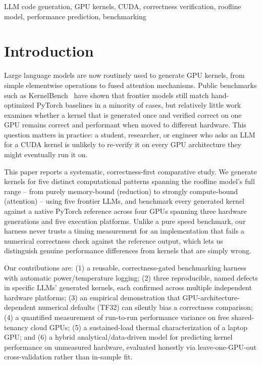 \documentclass[conference]{IEEEtran}
\begin{document}
\begin{IEEEkeywords}
LLM code generation, GPU kernels, CUDA, correctness verification, roofline model, performance
prediction, benchmarking
\end{IEEEkeywords}

\section{Introduction}

Large language models are now routinely used to generate GPU kernels, from simple elementwise
operations to fused attention mechanisms. Public benchmarks such as KernelBench~\cite{kernelbench}
have shown that frontier models still match hand-optimized PyTorch baselines in a minority of
cases, but relatively little work examines whether a kernel that is generated once and verified
correct on one GPU remains correct and performant when moved to different hardware. This question
matters in practice: a student, researcher, or engineer who asks an LLM for a CUDA kernel is
unlikely to re-verify it on every GPU architecture they might eventually run it on.

This paper reports a systematic, correctness-first comparative study. We generate kernels for five
distinct computational patterns spanning the roofline model's full range -- from purely
memory-bound (reduction) to strongly compute-bound (attention) -- using five frontier LLMs, and
benchmark every generated kernel against a native PyTorch reference across four GPUs spanning
three hardware generations and five execution platforms. Unlike a pure speed benchmark, our
harness never trusts a timing measurement for an implementation that fails a numerical
correctness check against the reference output, which lets us distinguish genuine performance
differences from kernels that are simply wrong.

Our contributions are: (1) a reusable, correctness-gated benchmarking harness with automatic
power/temperature logging; (2) three reproducible, named defects in specific LLMs' generated
kernels, each confirmed across multiple independent hardware platforms; (3) an empirical
demonstration that GPU-architecture-dependent numerical defaults (TF32) can silently bias a
correctness comparison; (4) a quantified measurement of run-to-run performance variance on free
shared-tenancy cloud GPUs; (5) a sustained-load thermal characterization of a laptop GPU; and (6) a
hybrid analytical/data-driven model for predicting kernel performance on unmeasured hardware,
evaluated honestly via leave-one-GPU-out cross-validation rather than in-sample fit.
\end{document}
